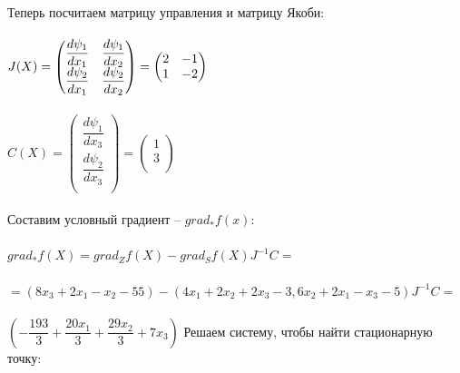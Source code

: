 \documentclass[14pt,a4paper,fleqn]{extarticle}
\begin{document}
	Теперь посчитаем матрицу управления и матрицу Якоби:\\\\
	$J(X) = \begin{pmatrix}
			\dfrac{d\psi_1}{dx_1} & \dfrac{d\psi_1}{dx_2}\\
			\dfrac{d\psi_2}{dx_1} & \dfrac{d\psi_2}{dx_2}\\
		\end{pmatrix} =
		\begin{pmatrix}
			2 & -1\\
			1 & -2\\
		\end{pmatrix}\\
	$\\\\
	$C(X) = \begin{pmatrix}
			\dfrac{d\psi_1}{dx_3}\\
			\dfrac{d\psi_2}{dx_3}\\
		\end{pmatrix} =
		\begin{pmatrix}
			1\\
			3\\
		\end{pmatrix}$\\\\
	Составим условный градиент -- $grad_* f(x)$:\\\\
	$grad_* f(X) = grad_Z f(X) - grad_S f(X) J^{-1} C =$\\\\
	$= (8x_3 + 2x_1 - x_2 - 55) - (4x_1 + 2x_2 + 2x_3 - 3, 6x_2 + 2x_1 - x_3 - 5) J^{-1} C =$\\\\
	$(-\dfrac{193}{3} + \dfrac{20x_1}{3} + \dfrac{29x_2}{3} + 7x_3)$
	\newpage
	Решаем систему, чтобы найти стационарную точку:\\\\
		\\\\
\end{document}
